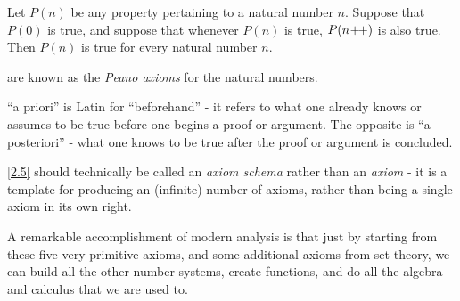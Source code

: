 \begin{ax}\label{2.5}
  Let \(P(n)\) be any property pertaining to a natural number \(n\).
  Suppose that \(P(0)\) is true, and suppose that whenever \(P(n)\) is true, \(P(n\!+\!\!+)\) is also true.
  Then \(P(n)\) is true for every natural number \(n\).
\end{ax}

\begin{note}
   are known as the \emph{Peano axioms} for the natural numbers.
\end{note}

\begin{note}
  ``a priori'' is Latin for ``beforehand''
  - it refers to what one already knows or assumes to be true before one begins a proof or argument.
  The opposite is ``a posteriori''
  - what one knows to be true after the proof or argument is concluded.
\end{note}

\begin{note}
  \cref{2.5} should technically be called an \emph{axiom schema} rather than an \emph{axiom}
  - it is a template for producing an (infinite) number of axioms, rather than being a single axiom in its own right.
\end{note}

\begin{note}
  A remarkable accomplishment of modern analysis is that just by starting from these five very primitive axioms, and some additional axioms from set theory, we can build all the other number systems, create functions, and do all the algebra and calculus that we are used to.
\end{note}